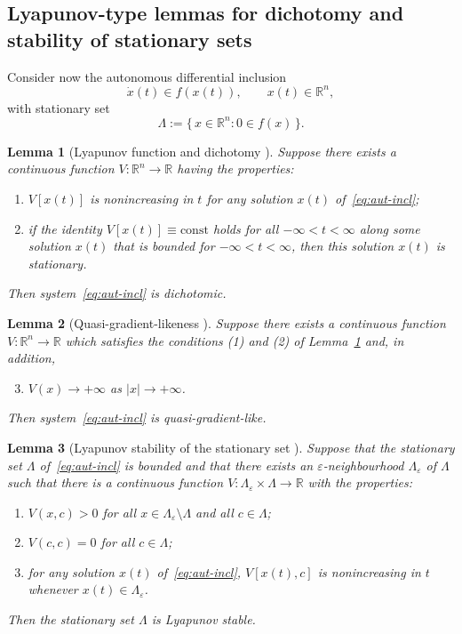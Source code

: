 \documentclass[journal]{IEEEtran}
\theoremstyle{myplain}
\newtheorem{lemma}{Lemma}
\begin{document}
\subsection{Lyapunov-type lemmas for dichotomy and stability of stationary sets}

Consider now the autonomous differential inclusion
\begin{equation}\label{eq:aut-incl}
   \dot x(t) \in f(x(t)), \qquad x(t)\in\mathbb{R}^n,
\end{equation}
with stationary set
\[
   \Lambda := \{\,x\in\mathbb{R}^n : 0\in f(x)\,\}.
\]

\begin{lemma}[Lyapunov function and dichotomy {\cite[Lem.~1.4]{YLG}}]\label{lem:YLGl1-4}
Suppose there exists a continuous function $V:\mathbb{R}^n\to\mathbb{R}$
having the properties:
\begin{enumerate}
  \item $V[x(t)]$ is nonincreasing in $t$ for any solution $x(t)$
        of~\eqref{eq:aut-incl};
  \item if the identity $V[x(t)]\equiv\mathrm{const}$ holds for all
        $-\infty<t<\infty$ along some solution $x(t)$ that is bounded
        for $-\infty<t<\infty$, then this solution $x(t)$ is stationary.
\end{enumerate}
Then system~\eqref{eq:aut-incl} is dichotomic.
\end{lemma}

\begin{lemma}[Quasi-gradient-likeness {\cite[Lem.~1.5]{YLG}}]\label{lem:YLGl1-5}
Suppose there exists a continuous function $V:\mathbb{R}^n\to\mathbb{R}$
which satisfies the conditions \emph{(1)} and \emph{(2)} of
Lemma~\ref{lem:YLGl1-4} and, in addition,
\begin{enumerate}
  \setcounter{enumi}{2}
  \item $V(x)\to +\infty$ as $|x|\to +\infty$.
\end{enumerate}
Then system~\eqref{eq:aut-incl} is quasi-gradient-like.
\end{lemma}

\begin{lemma}[Lyapunov stability of the stationary set {\cite[Lem.~1.6]{YLG}}]\label{lem:YLGl1-6}
Suppose that the stationary set $\Lambda$ of~\eqref{eq:aut-incl} is
bounded and that there exists an $\varepsilon$-neighbourhood
$\Lambda_\varepsilon$ of $\Lambda$ such that there is a continuous
function $V:\Lambda_\varepsilon\times\Lambda\to\mathbb{R}$ with the
properties:
\begin{enumerate}
  \item $V(x,c)>0$ for all $x\in\Lambda_\varepsilon\setminus\Lambda$ and
        all $c\in\Lambda$;
  \item $V(c,c)=0$ for all $c\in\Lambda$;
  \item for any solution $x(t)$ of~\eqref{eq:aut-incl},
        $V[x(t),c]$ is nonincreasing in $t$ whenever $x(t)\in\Lambda_\varepsilon$.
\end{enumerate}
Then the stationary set $\Lambda$ is Lyapunov stable.
\end{lemma}
\end{document}

